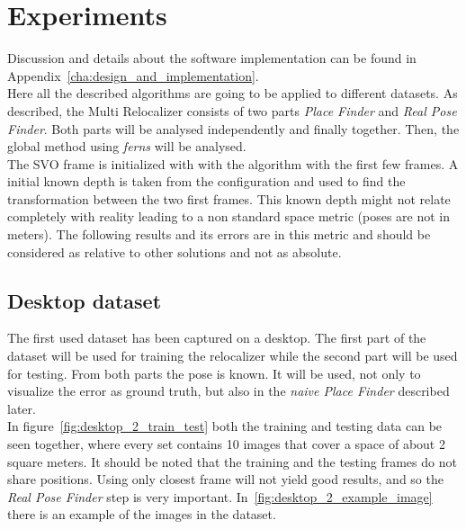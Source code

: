 \chapter{Experiments}\label{sec:experiments}

Discussion and details about the software implementation can be found in Appendix~\ref{cha:design_and_implementation}.\\

Here all the described algorithms are going to be applied to different datasets. As described, the Multi Relocalizer consists of two parts \textit{Place Finder} and \textit{Real Pose Finder}. Both parts will be analysed independently and finally together. Then, the global method using \textit{ferns} will be analysed.\\

The SVO frame is initialized with with the algorithm with the first few frames. A initial known depth is taken from the configuration and used to find the transformation between the two first frames. This known depth might not relate completely with reality leading to a non standard space metric (poses are not in meters). The following results and its errors are in this metric and should be considered as relative to other solutions and not as absolute.\\

\section{Desktop dataset}

The first used dataset has been captured on a desktop. The first part of the dataset will be used for training the relocalizer while the second part will be used for testing. From both parts the pose is known. It will be used, not only to visualize the error as ground truth, but also in the \textit{naive Place Finder} described later.\\

In figure~\ref{fig:desktop_2_train_test} both the training and testing data can be seen together, where every set contains 10 images that cover a space of about 2 square meters. It should be noted that the training and the testing frames do not share positions. Using only closest frame will not yield good results, and so the \textit{Real Pose Finder} step is very important. In~\ref{fig:desktop_2_example_image} there is an example of the images in the dataset.\\

